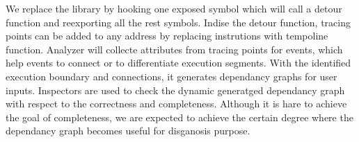 We replace the library by hooking one exposed symbol which will call a detour function and reexporting all the rest symbols.
Indise the detour function, tracing points can be added to any address by replacing instrutions with tempoline function.
Analyzer will collecte attributes from tracing points for events, which help events to connect or to differentiate execution segments.
With the identified execution boundary and connections, it generates dependancy graphs for user inputs.
Inspectors are used to check the dynamic generatged dependancy graph with respect to the correctness and completeness.
Although it is hare to achieve the goal of completeness, we are expected to achieve the certain degree where the dependancy graph becomes useful for disganosis purpose.
